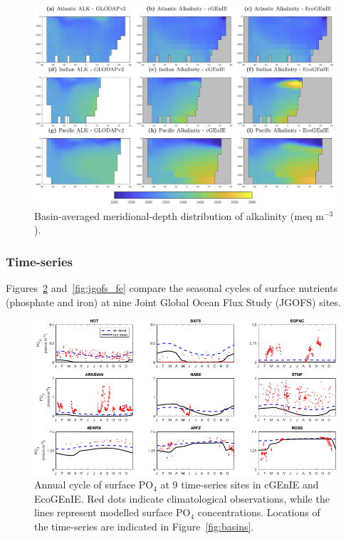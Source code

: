 \documentclass[gmd, manuscript]{copernicus}
\begin{document}
{\begin{figure}[htp]
\includegraphics[width=0.95\linewidth]{Final_figures/Fig_11.png}
\caption{Basin-averaged meridional-depth distribution of alkalinity (meq m$^{-3}$).}
\label{fig:basin_ALK}
\end{figure}

\clearpage
\subsubsection{Time-series}

Figures~\ref{fig:jgofs_po4} and~\ref{fig:jgofs_fe} compare the seasonal cycles of surface nutrients (phosphate and iron) at nine Joint Global Ocean Flux Study (JGOFS) sites.

 \begin{figure}[htbp]
\begin{center}
\includegraphics[width=\linewidth]{Final_figures/Fig_12.png}
\caption{Annual cycle of surface PO$_4$ at 9 time-series sites in cGEnIE and EcoGEnIE. Red dots indicate climatological observations, while the lines represent modelled surface PO$_4$ concentrations. Locations of the time-series are indicated in Figure~\ref{fig:basins}.}
\label{fig:jgofs_po4}
\end{center}
\end{figure}


}
\end{document}
